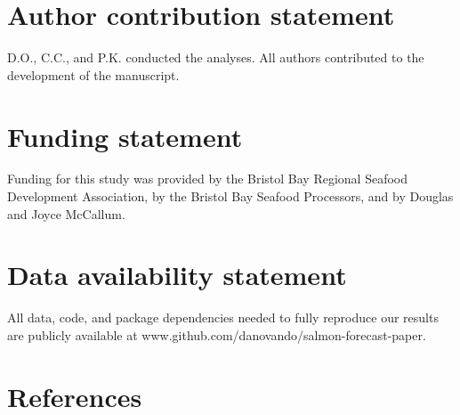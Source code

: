 \documentclass[
]{article}
\begin{document}
\hypertarget{author-contribution-statement}{%
\section*{Author contribution statement}\label{author-contribution-statement}}

D.O., C.C., and P.K. conducted the analyses. All authors contributed to the development of the manuscript.

\hypertarget{funding-statement}{%
\section*{Funding statement}\label{funding-statement}}

Funding for this study was provided by the Bristol Bay Regional Seafood Development Association, by the Bristol Bay Seafood Processors, and by Douglas and Joyce McCallum.

\hypertarget{data-availability-statement}{%
\section*{Data availability statement}\label{data-availability-statement}}

All data, code, and package dependencies needed to fully reproduce our results are publicly available at www.github.com/danovando/salmon-forecast-paper.

\hypertarget{references}{%
\section*{References}\label{references}}
\end{document}
